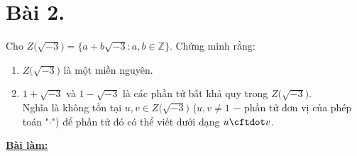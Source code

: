 \section*{Bài 2.}

Cho $Z \big( \sqrt{-3} \big) = \big\{ a + b\sqrt{-3} : a, b \in \mathbb{Z} \big\}$. Chứng minh rằng:
\begin{enumerate}[label=\alph*.]
    \item $Z \big( \sqrt{-3} \big)$ là một miền nguyên.

    \item $1 + \sqrt{-3}$ và $1 - \sqrt{-3}$ là các phần tử bất khả quy trong $Z \big( \sqrt{-3} \big)$.\\
    Nghĩa là không tồn tại $u, v \in Z \big( \sqrt{-3} \big)$ ($u, v \neq 1$ $-$ phần tử đơn vị của phép toán "$\cdot$") để phần tử đó có thể viết dưới dạng $u \cftdot v$.
\end{enumerate}
	

\centering
\textbf{\underline{Bài làm:}}

